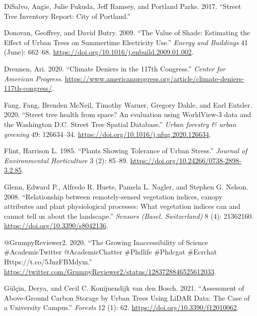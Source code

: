 \documentclass[12pt,twoside]{reedthesis}
\newlength{\cslhangindent}
\newenvironment{CSLReferences}[2] %
 {%
  \setlength{\parindent}{0pt}
  \ifodd #1 \everypar{\setlength{\hangindent}{\cslhangindent}}\ignorespaces\fi
  \ifnum #2 > 0
  \setlength{\parskip}{#2\baselineskip}
  \fi
 }%
 {}
\begin{document}
\begin{CSLReferences}{1}{0}
\leavevmode{}%
DiSalvo, Angie, Julie Fukuda, Jeff Ramsey, and Portland Parks. 2017. {``Street Tree Inventory Report: City of Portland.''}

\leavevmode{}%
Donovan, Geoffrey, and David Butry. 2009. {``The Value of Shade: Estimating the Effect of Urban Trees on Summertime Electricity Use.''} \emph{Energy and Buildings} 41 (June): 662--68. \url{https://doi.org/10.1016/j.enbuild.2009.01.002}.

\leavevmode{}%
Drennen, Ari. 2020. {``Climate Deniers in the 117th Congress.''} \emph{Center for American Progress}. \url{https://www.americanprogress.org/article/climate-deniers-117th-congress/}.

\leavevmode{}%
Fang, Fang, Brenden McNeil, Timothy Warner, Gregory Dahle, and Earl Eutsler. 2020. {``Street tree health from space? An evaluation using WorldView-3 data and the Washington D.C. Street Tree Spatial Database.''} \emph{Urban forestry \& urban greening} 49: 126634--34. \url{https://doi.org/10.1016/j.ufug.2020.126634}.

\leavevmode{}%
Flint, Harrison L. 1985. {``Plants Showing Tolerance of Urban Stress.''} \emph{Journal of Environmental Horticulture} 3 (2): 85--89. \url{https://doi.org/10.24266/0738-2898-3.2.85}.

\leavevmode{}%
Glenn, Edward P., Alfredo R. Huete, Pamela L. Nagler, and Stephen G. Nelson. 2008. {``Relationship between remotely-sensed vegetation indices, canopy attributes and plant physiological processes: What vegetation indices can and cannot tell us about the landscape.''} \emph{Sensors (Basel, Switzerland)} 8 (4): 21362160. \url{https://doi.org/10.3390/s8042136}.

\leavevmode{}%
@GrumpyReviewer2. 2020. {``The Growing Inaccessibility of Science {\#}AcademicTwitter @AcademicChatter {\#}Phdlife {\#}Phdcgat {\#}Ecrchat Https://t.co/5JnzFBMdym.''} \url{https://twitter.com/GrumpyReviewer2/status/1283728846525612033}.

\leavevmode{}%
Gülçin, Derya, and Cecil C. Konijnendijk van den Bosch. 2021. {``Assessment of Above-Ground Carbon Storage by Urban Trees Using LiDAR Data: The Case of a University Campus.''} \emph{Forests} 12 (1): 62. \url{https://doi.org/10.3390/f12010062}.


\end{CSLReferences}
\end{document}
